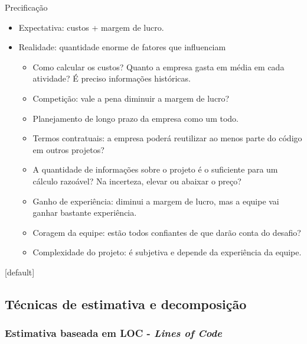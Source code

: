 \documentclass{beamer}
\begin{document}
\begin{frame}{Precificação}
	\begin{itemize}
		\justifying
		\item Expectativa: custos + margem de lucro.
		\item<2-> Realidade: quantidade enorme de fatores que influenciam
		\begin{itemize}
			\justifying
			\item<3> Como calcular os custos? Quanto a empresa gasta em média em cada atividade? É preciso informações históricas.
			\item<4> Competição: vale a pena diminuir a margem de lucro?
			\item<5> Planejamento de longo prazo da empresa como um todo.
			\item<6> Termos contratuais: a empresa poderá reutilizar ao menos parte do código em outros projetos?
			\item<7> A quantidade de informações sobre o projeto é o suficiente para um cálculo razoável? Na incerteza, elevar ou abaixar o preço?
			\item<8> Ganho de experiência: diminui a margem de lucro, mas a equipe vai ganhar bastante experiência.
			\item<9> Coragem da equipe: estão todos confiantes de que darão conta do desafio?
			\item<10> Complexidade do projeto: é subjetiva e depende da experiência da equipe.
		\end{itemize}
	\end{itemize}
\end{frame}

[default]

\subsection{Técnicas de estimativa e decomposição}

\subsubsection{Estimativa baseada em LOC - \textit{Lines of Code}}
\end{document}
